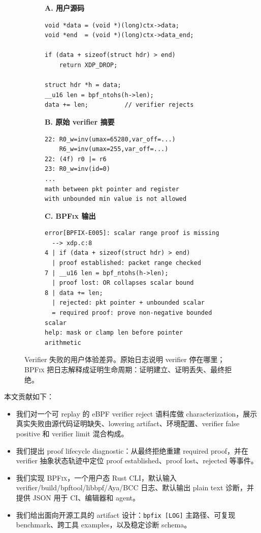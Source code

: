 \documentclass[letterpaper,twocolumn,10pt]{article}
\newcommand{\sys}{\textsc{BPFix}\xspace}
\newcommand{\code}[1]{\texttt{#1}}
\begin{document}
\begin{figure}[t]
\centering
\begin{subfigure}[t]{0.31\textwidth}
\textbf{A. 用户源码}
\begin{lstlisting}[style=ccode]
void *data = (void *)(long)ctx->data;
void *end  = (void *)(long)ctx->data_end;

if (data + sizeof(struct hdr) > end)
    return XDP_DROP;

struct hdr *h = data;
__u16 len = bpf_ntohs(h->len);
data += len;          // verifier rejects
\end{lstlisting}
\end{subfigure}
\hfill
\begin{subfigure}[t]{0.32\textwidth}
\textbf{B. 原始 verifier 摘要}
\begin{lstlisting}[style=tinycode]
22: R0_w=inv(umax=65280,var_off=...)
    R6_w=inv(umax=255,var_off=...)
22: (4f) r0 |= r6
23: R0_w=inv(id=0)
...
math between pkt pointer and register
with unbounded min value is not allowed
\end{lstlisting}
\end{subfigure}
\hfill
\begin{subfigure}[t]{0.32\textwidth}
\textbf{C. \sys 输出}
\begin{lstlisting}[style=tinycode]
error[BPFIX-E005]: scalar range proof is missing
  --> xdp.c:8
4 | if (data + sizeof(struct hdr) > end)
  | proof established: packet range checked
7 | __u16 len = bpf_ntohs(h->len);
  | proof lost: OR collapses scalar bound
8 | data += len;
  | rejected: pkt pointer + unbounded scalar
  = required proof: prove non-negative bounded scalar
help: mask or clamp len before pointer arithmetic
\end{lstlisting}
\end{subfigure}
\caption{Verifier 失败的用户体验差异。原始日志说明 verifier 停在哪里；\sys 把日志解释成证明生命周期：证明建立、证明丢失、最终拒绝。}
\label{fig:motivation}
\end{figure}

本文贡献如下：
\begin{itemize}
  \item 我们对一个可 replay 的 eBPF verifier reject 语料库做 characterization，展示真实失败由源代码证明缺失、lowering artifact、环境配置、verifier false positive 和 verifier limit 混合构成。
  \item 我们提出 proof lifecycle diagnostic：从最终拒绝重建 required proof，并在 verifier 抽象状态轨迹中定位 proof established、proof lost、rejected 等事件。
  \item 我们实现 \sys，一个用户态 Rust CLI，默认输入 verifier/build/bpftool/libbpf/Aya/BCC 日志、默认输出 plain text 诊断，并提供 JSON 用于 CI、编辑器和 agent。
  \item 我们给出面向开源工具的 artifact 设计：\code{bpfix [LOG]} 主路径、可复现 benchmark、跨工具 examples，以及稳定诊断 schema。
\end{itemize}
\end{document}
